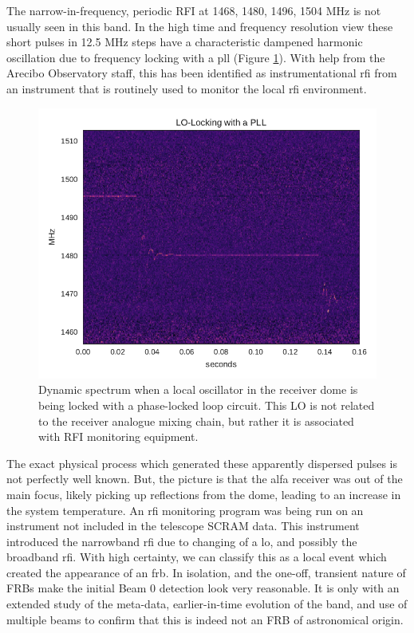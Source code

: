 \documentclass[a4paper,fleqn,usenatbib]{mnras}
\begin{document}
The narrow-in-frequency, periodic RFI at 1468, 1480, 1496,
1504 MHz is not usually seen in this band. In the high time and frequency
resolution view these short pulses in 12.5 MHz steps have a characteristic
dampened harmonic oscillation due to frequency locking with a \gls{pll} (Figure
\ref{fig:pll_spectrum}). With help from the Arecibo Observatory staff, this has
been identified as instrumentational \gls{rfi} from an instrument that is
routinely used to monitor the local \gls{rfi} environment.
%
\begin{figure}
    \includegraphics[width=1.0\linewidth]{figures/pll_spectrum.pdf}
    \caption{Dynamic spectrum when a local oscillator in the receiver dome is
    being locked with a phase-locked loop circuit. This LO is not related to
    the receiver analogue mixing chain, but rather it is associated with RFI
    monitoring equipment.
    }
    \label{fig:pll_spectrum}
\end{figure}
%
The exact physical process which generated these apparently dispersed pulses is
not perfectly well known. But, the picture is that the \gls{alfa} receiver was
out of the main focus, likely picking up reflections from the dome, leading to
an increase in the system temperature. An \gls{rfi} monitoring program was being
run on an instrument not included in the telescope SCRAM data. This instrument
introduced the narrowband \gls{rfi} due to changing of a \gls{lo}, and possibly
the broadband \gls{rfi}. With high certainty, we can classify this as a local
event which created the appearance of an \gls{frb}.  In isolation, and the
one-off, transient nature of FRBs make the initial Beam 0 detection look very
reasonable. It is only with an extended study of the meta-data, earlier-in-time
evolution of the band, and use of multiple beams to confirm that this is indeed
not an FRB of astronomical origin.
\end{document}
